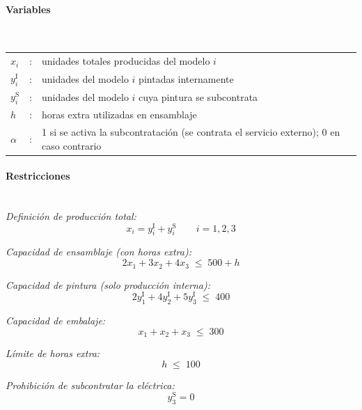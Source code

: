 \paragraph{Variables}\mbox{}\\
\begin{tabular}{lcl}
$x_i$ & : & unidades totales producidas del modelo $i$ \\
$y_i^{\mathrm{I}}$ & : & unidades del modelo $i$ pintadas internamente \\
$y_i^{\mathrm{S}}$ & : & unidades del modelo $i$ cuya pintura se subcontrata \\
$h$ & : & horas extra utilizadas en ensamblaje \\
$\alpha$ & : & 1 si se activa la subcontratación (se contrata el servicio externo); 0 en caso contrario \\
\end{tabular}

\paragraph{Restricciones}\mbox{}\\[1mm]

\textit{Definición de producción total:}
\begin{equation}
x_i = y_i^{\mathrm{I}} + y_i^{\mathrm{S}} \qquad i = 1,2,3
\end{equation}

\textit{Capacidad de ensamblaje (con horas extra):}
\begin{equation}
2x_1 + 3x_2 + 4x_3 \;\leq\; 500 + h
\end{equation}

\textit{Capacidad de pintura (solo producción interna):}
\begin{equation}
2y_1^{\mathrm{I}} + 4y_2^{\mathrm{I}} + 5y_3^{\mathrm{I}} \;\leq\; 400
\end{equation}

\textit{Capacidad de embalaje:}
\begin{equation}
x_1 + x_2 + x_3 \;\leq\; 300
\end{equation}

\textit{Límite de horas extra:}
\begin{equation}
h \;\leq\; 100
\end{equation}

\textit{Prohibición de subcontratar la eléctrica:}
\begin{equation}
y_3^{\mathrm{S}} = 0
\end{equation}


